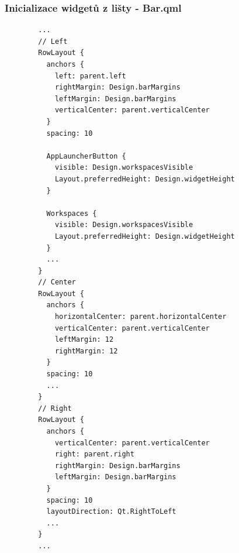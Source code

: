 \documentclass[12pt,a4paper]{article}
\begin{document}
\subsubsection{Inicializace widgetů z lišty - Bar.qml}
\label{Bar.qml 1}
\begin{lstlisting}
        ...
        // Left
        RowLayout {
          anchors {
            left: parent.left
            rightMargin: Design.barMargins
            leftMargin: Design.barMargins
            verticalCenter: parent.verticalCenter
          }
          spacing: 10

          AppLauncherButton {
            visible: Design.workspacesVisible
            Layout.preferredHeight: Design.widgetHeight
          }
          
          Workspaces {
            visible: Design.workspacesVisible
            Layout.preferredHeight: Design.widgetHeight
          }
          ...
        }
        // Center
        RowLayout {
          anchors {
            horizontalCenter: parent.horizontalCenter
            verticalCenter: parent.verticalCenter
            leftMargin: 12
            rightMargin: 12
          }
          spacing: 10
          ...
        }
        // Right
        RowLayout {
          anchors {
            verticalCenter: parent.verticalCenter
            right: parent.right
            rightMargin: Design.barMargins
            leftMargin: Design.barMargins
          }
          spacing: 10
          layoutDirection: Qt.RightToLeft
          ...
        }
        ...
\end{lstlisting}

\clearpage
\end{document}
